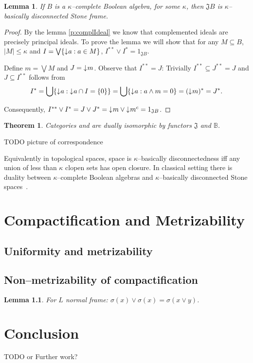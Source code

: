 \documentclass[12pt,a4paper,fleqn]{report}
\newcounter{thmCounter}[section]
\theoremstyle{newthmstyle}
\newtheorem{lemma}[thmCounter]{Lemma}
\newtheorem{theorem}[thmCounter]{Theorem}
\theoremstyle{newthmstyleNormal}
\newcommand\J{\ensuremath{\mathfrak{J}}}
\newcommand\Bc{\ensuremath{\mathbb{B}}} %
\newcommand\downset{\mathord{\downarrow}\mkern1mu} %
\begin{document}
\begin{lemma}
    If $B$ is a $\kappa$--complete Boolean algebra, for some $\kappa$, then $\J B$ is $\kappa$--basically disconnected Stone frame.
\end{lemma}
\begin{proof}
    By the lemma \ref{p:complIdeal} we know that complemented ideals are precisely principal ideals. To prove the lemma we will show that for any $M \subseteq B$, $|M| \leq \kappa$ and $I = \bigvee \{ \downset a : a \in M \}$, $I^{**} \vee I^* = 1_{\J B}$.

    Define $m = \bigvee M$ and $J = \downset m$. Observe that $I^{**} = J$: Trivially $I^{**} \subseteq J^{**} = J$ and $J \subseteq I^{**}$ follows from
    $$ I^* = \bigcup \{ \downset a : \downset a \cap I = \{0\} \} = \bigcup \{ \downset a : a \wedge m = 0 \} = (\downset m)^* = J^*.$$

    Consequently, $I^{**} \vee I^* = J \vee J^* = \downset m \vee \downset m^c = 1_{\J B}$.
\end{proof}

\begin{theorem}
    Categories \kBDStoneFrm{} and \kComplBool{} are dually isomorphic by functors \J{} and \Bc{}.
\end{theorem}

TODO picture of correspondence

Equivalently in topological spaces, space is $\kappa$--basically disconnectedness iff any union of less than $\kappa$ clopen sets has open closure. In classical setting there is duality between $\kappa$--complete Boolean algebras and $\kappa$--basically disconnected Stone spaces~\cite{monk1989handbook}.

\chapter{Compactification and Metrizability}
\section{Uniformity and metrizability}
\section{Non--metrizability of compactification}
\begin{lemma}
    For $L$ normal frame: $\sigma(x)\vee\sigma(x) = \sigma(x\vee y)$.
\end{lemma}

\chapter{Conclusion}
TODO or Further work?




\clearpage
\printindex
\end{document}
